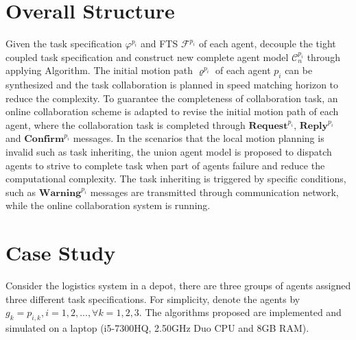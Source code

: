 \documentclass[journal]{IEEEtran}
\begin{document}
\section{Overall Structure}
Given the task specification $\varphi^{p_i}$ and FTS $\mathcal{F}^{p_i}$ of each agent, decouple the tight coupled task specification and construct new complete agent model $\mathcal{C}^{p_i}_n$ through applying Algorithm. The initial motion path $\varrho^{p_i}$ of each agent $p_i$ can be synthesized and the task collaboration is planned in speed matching horizon to reduce the complexity. To guarantee the completeness of collaboration task, an online collaboration scheme is adapted to revise the initial motion path of each agent, where the collaboration task is completed through $\textbf{Request}^{p_i}$, $\textbf{Reply}^{p_i}$ and $\textbf{Confirm}^{p_i}$ messages. In the scenarios that the local motion planning is invalid such as task inheriting, the union agent model is proposed to dispatch agents to strive to complete task when part of agents failure and reduce the computational complexity. The task inheriting is triggered by specific conditions, such as $\textbf{Warning}^{p_i}$ messages are transmitted through communication network, while the online collaboration system is running.
\section{Case Study}
Consider the logistics system in a depot, there are three groups of agents assigned three different task specifications. For simplicity, denote the agents by $g_k={p_{i,k},i=1,2,...},\forall k=1,2,3$. The algorithms proposed are implemented and simulated on a laptop (i5-7300HQ, 2.50GHz Duo CPU and 8GB RAM).
\end{document}
